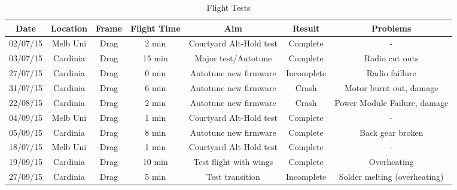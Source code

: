 



\label{sec:diary}
\begin{table}[htbp]
	\centering
	\begin{tabular}{|c|c|c|c|c|c|c|}
		\hline Date & Location & Frame & Flight Time & Aim & Result & Problems \\ 
		\hline 02/07/15 & Melb Uni & Drag & 2 min & Courtyard Alt-Hold test & Complete & - \\ 
		\hline 03/07/15 & Cardinia & Drag & 15 min & Major test/Autotune & Complete & Radio cut outs \\ 
		\hline 27/07/15 & Cardinia  & Drag & 0 min & Autotune new firmware & Incomplete & Radio faillure \\ 
		\hline 31/07/15 & Cardinia  & Drag & 6 min & Autotune new firmware & Crash & Motor burnt out, damage  \\ 
		\hline 22/08/15 & Cardinia  & Drag & 2 min & Autotune new firmware & Crash & Power Module Failure, damage\\
		\hline 04/09/15 & Melb Uni & Drag & 1 min & Courtyard Alt-Hold test & Complete & - \\  
		\hline 05/09/15 & Cardinia  & Drag & 8 min & Autotune new firmware & Complete & Back gear broken\\
		\hline 18/07/15 & Melb Uni & Drag & 1 min & Courtyard Alt-Hold test & Complete & - \\  
		\hline 19/09/15 & Cardinia  & Drag & 10 min & Test flight with wings & Complete & Overheating \\ 
		\hline 27/09/15 & Cardinia  & Drag & 5 min & Test transition & Incomplete & Solder melting (overheating) \\ 
		\hline 
	\end{tabular} 
	\caption{Flight Tests}
	\label{tab:tests}
\end{table}


